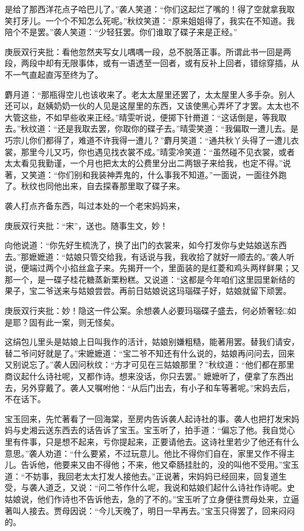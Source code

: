 \begin{parag}
是给了那西洋花点子哈巴儿了。”袭人笑道：“你们这起烂了嘴的！得了空就拿我取笑打牙儿。一个个不知怎么死呢。”秋纹笑道：“原来姐姐得了，我实在不知道。我陪个不是罢。”袭人笑道：“少轻狂罢。你们谁取了碟子来是正经。”\begin{note}庚辰双行夹批：看他忽然夹写女儿喁喁一段，总不脱落正事。所谓此书一回是两段，两段中却有无限事体，或有一语透至一回者，或有反补上回者，错综穿插，从不一气直起直泻至终为了。\end{note}麝月道：“那瓶得空儿也该收来了。老太太屋里还罢了，太太屋里人多手杂。别人还可以，赵姨奶奶一伙的人见是这屋里的东西，又该使黑心弄坏了才罢。太太也不大管这些，不如早些收来正经。”晴雯听说，便掷下针黹道：“这话倒是，等我取去。”秋纹道：“还是我取去罢，你取你的碟子去。”晴雯笑道：“我偏取一遭儿去。是巧宗儿你们都得了，难道不许我得一遭儿？”麝月笑道：“通共秋丫头得了一遭儿衣裳，那里今儿又巧，你也遇见找衣裳不成。”晴雯冷笑道：“虽然碰不见衣裳，或者太太看见我勤谨，一个月也把太太的公费里分出二两银子来给我，也定不得。”说著，又笑道：“你们别和我装神弄鬼的，什么事我不知道。”一面说，一面往外跑了。秋纹也同他出来，自去探春那里取了碟子来。
\end{parag}


\begin{parag}
    袭人打点齐备东西，叫过本处的一个老宋妈妈来，\begin{note}庚辰双行夹批：“宋”，送也。随事生文，妙！\end{note}向他说道：“你先好生梳洗了，换了出门的衣裳来，如今打发你与史姑娘送东西去。”那嬷嬷道：“姑娘只管交给我，有话说与我，我收拾了就好一顺去的。”袭人听说，便端过两个小掐丝盒子来。先揭开一个，里面装的是红菱和鸡头两样鲜果；又那一个，是一碟子桂花糖蒸新栗粉糕。又说道：“这都是今年咱们这里园里新结的果子，宝二爷送来与姑娘尝尝。再前日姑娘说这玛瑙碟子好，姑娘就留下顽罢。\begin{note}庚辰双行夹批：妙！隐这一件公案。余想袭人必要玛瑙碟子盛去，何必娇奢轻□如是耶？固有此一案，则无怪矣。\end{note}这绢包儿里头是姑娘上日叫我作的活计，姑娘别嫌粗糙，能著用罢。替我们请安，替二爷问好就是了。”宋嬷嬷道：“宝二爷不知还有什么说的，姑娘再问问去，回来又别说忘了。”袭人因问秋纹：“方才可见在三姑娘那里？”秋纹道：“他们都在那里商议起什么诗社呢，又都作诗。想来没话，你只去罢。” 嬷嬷听了，便拿了东西出去，另外穿戴了。袭人又嘱咐他：“从后门出去，有小子和车等著呢。”宋妈去后，不在话下。
\end{parag}


\begin{parag}
    宝玉回来，先忙著看了一回海棠，至房内告诉袭人起诗社的事。袭人也把打发宋妈妈与史湘云送东西去的话告诉了宝玉。宝玉听了，拍手道：“偏忘了他。我自觉心里有件事，只是想不起来，亏你提起来，正要请他去。这诗社里若少了他还有什么意思。”袭人劝道：“什么要紧，不过玩意儿。他比不得你们自在，家里又作不得主儿。告诉他，他要来又由不得他；不来，他又牵肠挂肚的，没的叫他不受用。”宝玉道：“不妨事，我回老太太打发人接他去。”正说著，宋妈妈已经回来，回复道生受，与袭人道乏，又说：“问二爷作什么呢，我说和姑娘们起什么诗社作诗呢。史姑娘说，他们作诗也不告诉他去，急的了不的。”宝玉听了立身便往贾母处来，立逼著叫人接去。贾母因说：“今儿天晚了，明日一早再去。”宝玉只得罢了，回来闷闷的。
\end{parag}


